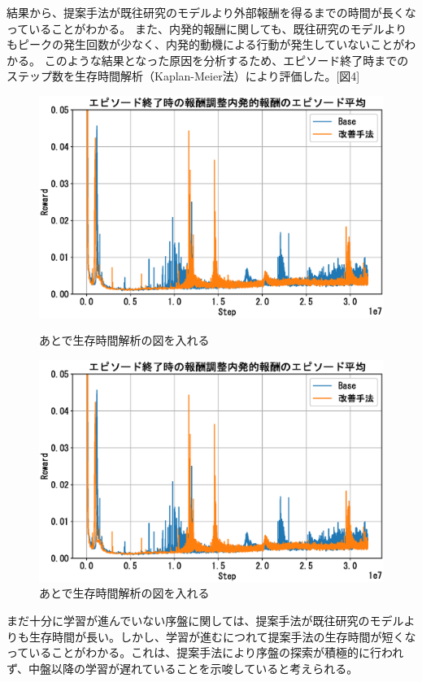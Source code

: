 結果から、提案手法が既往研究のモデルより外部報酬を得るまでの時間が長くなっていることがわかる。
また、内発的報酬に関しても、既往研究のモデルよりもピークの発生回数が少なく、内発的動機による行動が発生していないことがわかる。
このような結果となった原因を分析するため、エピソード終了時までのステップ数を生存時間解析（Kaplan-Meier法）により評価した。[図4]
\begin{figure}[t]
   \centering
   \begin{minipage}{0.23\textwidth}
       \centering
       \includegraphics[width=\textwidth]{Method1_Intr.eps}
       \caption{あとで生存時間解析の図を入れる}
       \label{fig:figure1}
   \end{minipage}
   \hfill
   \begin{minipage}{0.23\textwidth}
       \centering
       \includegraphics[width=\textwidth]{Method1_Intr.eps}
       \caption{あとで生存時間解析の図を入れる}
       \label{fig:figure2}
   \end{minipage}
\end{figure}
まだ十分に学習が進んでいない序盤に関しては、提案手法が既往研究のモデルよりも生存時間が長い。しかし、学習が進むにつれて提案手法の生存時間が短くなっていることがわかる。これは、提案手法により序盤の探索が積極的に行われず、中盤以降の学習が遅れていることを示唆していると考えられる。

